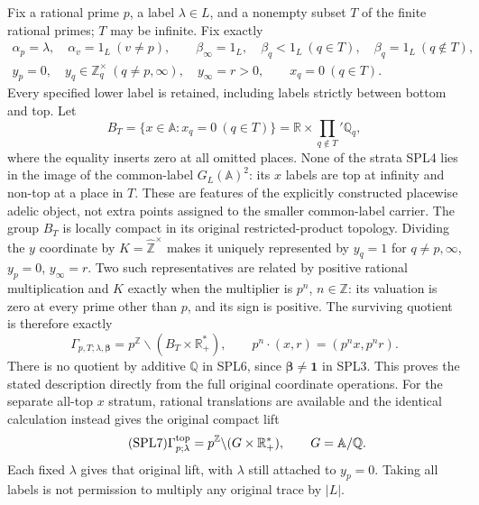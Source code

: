 Fix a rational prime $p$, a label $\lambda\in L$, and a nonempty subset
$T$ of the finite rational primes; $T$ may be infinite. Fix exactly
\begin{equation}\tag{SPL4}
\begin{gathered}
\alpha_p=\lambda,\quad \alpha_v=1_L\ (v\ne p),\qquad
\beta_\infty=1_L,\quad
\beta_q<1_L\ (q\in T),\quad \beta_q=1_L\ (q\notin T),\\
y_p=0,\quad y_q\in\mathbb Z_q^\times\ (q\ne p,\infty),\quad
y_\infty=r>0,\qquad x_q=0\ (q\in T).
\end{gathered}
\end{equation}
Every specified lower label is retained, including labels strictly
between bottom and top. Let
\begin{equation}\tag{SPL5}
B_T=\{x\in\mathbb A:x_q=0\ (q\in T)\}
=\mathbb R\times\prod_{q\notin T}'\mathbb Q_q,
\end{equation}
where the equality inserts zero at all omitted places. None of the
strata SPL4 lies in the image of the common-label $G_L(\mathbb A)^2$:
its $x$ labels are top at infinity and non-top at a place in $T$.
These are features of the explicitly constructed placewise adelic
object, not extra points assigned to the smaller common-label carrier.
The group $B_T$ is locally compact in its original restricted-product
topology. Dividing the $y$ coordinate by
$K=\widehat{\mathbb Z}^{\times}$ makes it uniquely represented by
$y_q=1$ for $q\ne p,\infty$, $y_p=0$, $y_\infty=r$.
Two such representatives are related by positive rational multiplication
and $K$ exactly when the multiplier is $p^n$, $n\in\mathbb Z$:
its valuation is zero at every prime other than $p$, and its sign is
positive. The surviving quotient is therefore exactly
\begin{equation}\tag{SPL6}
\Gamma_{p,T;\lambda,\boldsymbol\beta}
=p^{\mathbb Z}\backslash(B_T\times\mathbb R_+^*),\qquad
p^n\cdot(x,r)=(p^n x,p^n r).
\end{equation}
There is no quotient by additive $\mathbb Q$ in SPL6, since
$\boldsymbol\beta\ne\boldsymbol1$ in SPL3. This proves the stated
description directly from the full original coordinate operations.
For the separate all-top $x$ stratum, rational translations are available
and the identical calculation instead gives the original compact lift
\begin{equation}\tag{SPL7}
\Gamma_{p;\lambda}^{\rm top}
=p^{\mathbb Z}\backslash(G\times\mathbb R_+^*),
\qquad G=\mathbb A/\mathbb Q.
\end{equation}
Each fixed $\lambda$ gives that original lift, with $\lambda$ still
attached to $y_p=0$. Taking all labels is not permission to multiply
any original trace by $|L|$.

